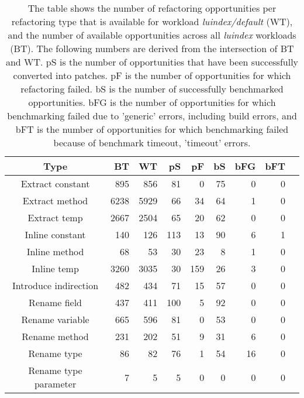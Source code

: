\begin{table}[!h]
\caption{The table shows the number of refactoring opportunities per refactoring type that is available for workload \textit{luindex/default} (WT), and the number of available opportunities across all \textit{luindex} workloads (BT). The following numbers are derived from the intersection of BT and WT. pS is the number of opportunities that have been successfully converted into patches. pF is the number of opportunities for which refactoring failed. bS is the number of successfully benchmarked opportunities. bFG is the number of opportunities for which benchmarking failed due to 'generic' errors, including build errors, and bFT is the number of opportunities for which benchmarking failed because of benchmark timeout, 'timeout' errors.}
\begin{tabular}{c|*{7}{r}r}
Type&BT&WT&pS&pF&bS&bFG&bFT\\
\hline
Extract constant&895&856&81&0&75&0&0\\
Extract method&6238&5929&66&34&64&1&0\\
Extract temp&2667&2504&65&20&62&0&0\\
Inline constant&140&126&113&13&90&6&1\\
Inline method&68&53&30&23&8&1&0\\
Inline temp&3260&3035&30&159&26&3&0\\
Introduce indirection&482&434&71&15&57&0&0\\
Rename field&437&411&100&5&92&0&0\\
Rename variable&665&596&81&0&53&0&0\\
Rename method&231&202&51&9&31&6&0\\
Rename type&86&82&76&1&54&16&0\\
Rename type parameter&7&5&5&0&0&0&0\\
\end{tabular}
\end{table}
